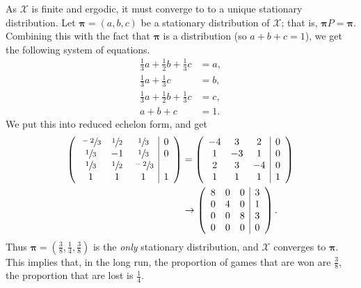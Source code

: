 \begin{solution}
    As $\mathcal X$ is finite and ergodic, it must converge to to a unique stationary distribution. Let $\bm\pi = (a, b, c)$ be a stationary distribution of $\mathcal X$; that is, $\bm\pi P = \bm\pi$. Combining this with the fact that $\bm\pi$ is a distribution (so $a+b+c =1$), we get the following system of equations.
    \begin{align*}
        \tfrac13 a + \tfrac12 b + \tfrac13 c & = a, \\[5pt]
        \tfrac13 a +              \tfrac13 c & = b, \\[5pt]
        \tfrac13 a + \tfrac12 b + \tfrac13 c & = c, \\[5pt]
        a + b +  c                           & = 1.
    \end{align*}
    We put this into reduced echelon form, and get
    \begin{align*}
        \left(
        \begin{array}{ccc|c}
            \sfrac{-2}3 & \sfrac12 & \sfrac13  & 0 \\
            \sfrac13   & -1       & \sfrac13   & 0 \\
            \sfrac13  & \sfrac12 & \sfrac{-2}3     \\
            1         & 1        & 1         & 1 \\
        \end{array}
        \right)
         & =
        \left(
        \begin{array}{ccc|c}
            -4 & 3  & 2  & 0 \\
            1  & -3 & 1  & 0 \\
            2  & 3  & -4 & 0 \\
            1  & 1  & 1  & 1 \\
        \end{array}
        \right)
        \\
         & \to
        \left(
        \begin{array}{ccc|c}
            8 & 0 & 0 & 3 \\
            0 & 4 & 0 & 1 \\
            0 & 0 & 8 & 3 \\
            0 & 0 & 0 & 0 \\
        \end{array}
        \right).
    \end{align*}
    Thus $\bm\pi = (\tfrac38, \tfrac14, \tfrac38)$ is the \emph{only} stationary distribution, and $\mathcal X$ converges to $\bm\pi$. This implies that, in the long run, the proportion of games that are won are $\tfrac38$, the proportion that are lost is $\tfrac14$.
\end{solution}